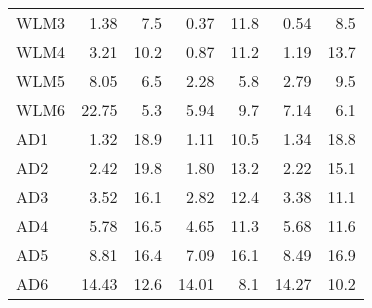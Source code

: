 \begin{table}[h]
\begin{center}
\begin{tabular}{||l||r|r||r|r||r|r||}
WLM3 & 1.38 & 7.5 & 0.37 & 11.8 & 0.54 & 8.5 \\ 
WLM4 & 3.21 & 10.2 & 0.87 & 11.2 & 1.19 & 13.7 \\ 
WLM5 & 8.05 & 6.5 & 2.28 & 5.8 & 2.79 & 9.5 \\ 
WLM6 &  22.75 & 5.3 & 5.94 & 9.7 & 7.14 & 6.1 \\ 
\hline
AD1 & 1.32 & 18.9 & 1.11 & 10.5 & 1.34 & 18.8 \\ 
AD2 & 2.42 & 19.8 & 1.80 & 13.2 & 2.22 & 15.1 \\ 
AD3 & 3.52 & 16.1 & 2.82 & 12.4 & 3.38 & 11.1 \\ 
AD4 &  5.78 & 16.5 & 4.65 & 11.3 & 5.68 & 11.6 \\ 
AD5 &  8.81 & 16.4 & 7.09 & 16.1 & 8.49 & 16.9 \\ 
AD6 &  14.43 & 12.6 & 14.01 & 8.1 & 14.27 & 10.2 \\ 
\hline
\end{tabular}\end{center}
\end{table}

